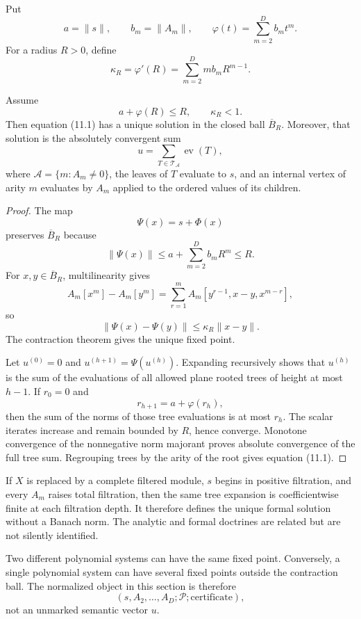 Put
\[
 a=\lVert s\rVert,
 \qquad
 b_m=\lVert A_m\rVert,
 \qquad
 \varphi(t)=\sum_{m=2}^{D}b_mt^m.
\]
For a radius $R>0$, define
\[
 \kappa_R=\varphi'(R)
 =\sum_{m=2}^{D}m b_mR^{m-1}.
\]

\begin{theorem}
\label{thm:block11-polynomial-fixed-point}
Assume
\[
 a+\varphi(R)\le R,
 \qquad
 \kappa_R<1.
\]
Then equation \textup{(11.1)} has a unique solution in the closed ball $\overline B_R$.  Moreover, that solution is the absolutely convergent sum
\[
 \boxed{
 u=\sum_{T\in\mathcal T_{\mathcal A}}\operatorname{ev}(T),}
 \tag{11.2}
\]
where $\mathcal A=\{m:A_m\neq0\}$, the leaves of $T$ evaluate to $s$, and an internal vertex of arity $m$ evaluates by $A_m$ applied to the ordered values of its children.
\end{theorem}

\begin{proof}
The map
\[
 \Psi(x)=s+\Phi(x)
\]
preserves $\overline B_R$ because
\[
 \lVert\Psi(x)\rVert
 \le a+\sum_{m=2}^{D}b_mR^m
 \le R.
\]
For $x,y\in\overline B_R$, multilinearity gives
\[
 A_m[x^m]-A_m[y^m]
 =
 \sum_{r=1}^{m}
 A_m[y^{r-1},x-y,x^{m-r}],
\]
so
\[
 \lVert\Psi(x)-\Psi(y)\rVert
 \le
 \kappa_R\lVert x-y\rVert.
\]
The contraction theorem gives the unique fixed point.

Let $u^{(0)}=0$ and $u^{(h+1)}=\Psi(u^{(h)})$.  Expanding recursively shows that $u^{(h)}$ is the sum of the evaluations of all allowed plane rooted trees of height at most $h-1$.  If $r_0=0$ and
\[
 r_{h+1}=a+\varphi(r_h),
\]
then the sum of the norms of those tree evaluations is at most $r_h$.  The scalar iterates increase and remain bounded by $R$, hence converge.  Monotone convergence of the nonnegative norm majorant proves absolute convergence of the full tree sum.  Regrouping trees by the arity of the root gives equation \textup{(11.1)}.
\end{proof}

\begin{remark}
If $X$ is replaced by a complete filtered module, $s$ begins in positive filtration, and every $A_m$ raises total filtration, then the same tree expansion is coefficientwise finite at each filtration depth.  It therefore defines the unique formal solution without a Banach norm.  The analytic and formal doctrines are related but are not silently identified.
\end{remark}

\begin{boundary}
Two different polynomial systems can have the same fixed point.  Conversely, a single polynomial system can have several fixed points outside the contraction ball.  The normalized object in this section is therefore
\[
 (s,A_2,\ldots,A_D;\mathcal P;\text{certificate}),
\]
not an unmarked semantic vector $u$.
\end{boundary}

